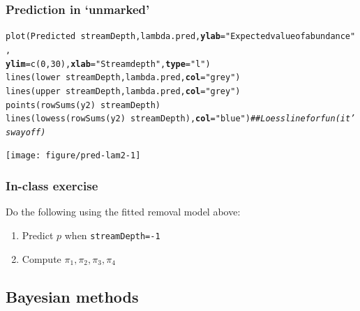 \documentclass[color=usenames,dvipsnames]{beamer}\usepackage[]{graphicx}\usepackage[]{color}
\makeatletter
\newcommand{\hlnum}[1]{\textcolor[rgb]{0.69,0.494,0}{#1}}%
\newcommand{\hlstr}[1]{\textcolor[rgb]{0.749,0.012,0.012}{#1}}%
\newcommand{\hlcom}[1]{\textcolor[rgb]{0.514,0.506,0.514}{\textit{#1}}}%
\newcommand{\hlopt}[1]{\textcolor[rgb]{0,0,0}{#1}}%
\newcommand{\hlstd}[1]{\textcolor[rgb]{0,0,0}{#1}}%
\newcommand{\hlkwc}[1]{\textcolor[rgb]{0,0,0}{\textbf{#1}}}%
\newcommand{\hlkwd}[1]{\textcolor[rgb]{0.004,0.004,0.506}{#1}}%
\newenvironment{kframe}{%
 \def\at@end@of@kframe{}%
 \ifinner\ifhmode%
  \def\at@end@of@kframe{\end{minipage}}%
  \begin{minipage}{\columnwidth}%
 \fi\fi%
 \def\FrameCommand##1{\hskip\@totalleftmargin \hskip-\fboxsep
 \colorbox{shadecolor}{##1}\hskip-\fboxsep
     \hskip-\linewidth \hskip-\@totalleftmargin \hskip\columnwidth}%
 \MakeFramed {\advance\hsize-\width
   \@totalleftmargin\z@ \linewidth\hsize
   \@setminipage}}%
 {\par\unskip\endMakeFramed%
 \at@end@of@kframe}
\newenvironment{knitrout}{}{} %
\makeatother
\begin{document}
\begin{frame}[fragile]
  \frametitle{Prediction in `unmarked'}
\begin{knitrout}\tiny
{}\color{fgcolor}\begin{kframe}
\begin{alltt}
\hlkwd{plot}\hlstd{(Predicted} \hlopt{~} \hlstd{streamDepth, lambda.pred,} \hlkwc{ylab}\hlstd{=}\hlstr{"Expected value of abundance"}\hlstd{,}
     \hlkwc{ylim}\hlstd{=}\hlkwd{c}\hlstd{(}\hlnum{0}\hlstd{,}\hlnum{30}\hlstd{),} \hlkwc{xlab}\hlstd{=}\hlstr{"Stream depth"}\hlstd{,} \hlkwc{type}\hlstd{=}\hlstr{"l"}\hlstd{)}
\hlkwd{lines}\hlstd{(lower} \hlopt{~} \hlstd{streamDepth, lambda.pred,} \hlkwc{col}\hlstd{=}\hlstr{"grey"}\hlstd{)}
\hlkwd{lines}\hlstd{(upper} \hlopt{~} \hlstd{streamDepth, lambda.pred,} \hlkwc{col}\hlstd{=}\hlstr{"grey"}\hlstd{)}
\hlkwd{points}\hlstd{(}\hlkwd{rowSums}\hlstd{(y2)}\hlopt{~}\hlstd{streamDepth)}
\hlkwd{lines}\hlstd{(}\hlkwd{lowess}\hlstd{(}\hlkwd{rowSums}\hlstd{(y2)}\hlopt{~}\hlstd{streamDepth),} \hlkwc{col}\hlstd{=}\hlstr{"blue"}\hlstd{)}  \hlcom{## Loess line for fun (it's way off)}
\end{alltt}
\end{kframe}

{\centering \texttt{[image: figure/pred-lam2-1]} 

}



\end{knitrout}
\end{frame}







\begin{frame}[fragile]
  \frametitle{In-class exercise}
  Do the following using the fitted removal model above:
  \begin{enumerate}
    \normalsize
    \item Predict $p$ when \verb+streamDepth=-1+
    \item Compute $\pi_1, \pi_2, \pi_3, \pi_4$
  \end{enumerate}
\end{frame}


\subsection{Bayesian methods}
\end{document}
